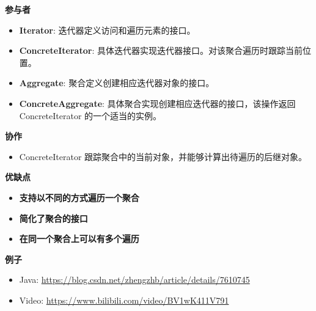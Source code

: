 \noindent\textbf{参与者}
\begin{itemize}
    \item \textbf{Iterator}: 迭代器定义访问和遍历元素的接口。
    \item \textbf{ConcreteIterator}: 具体迭代器实现迭代器接口。对该聚合遍历时跟踪当前位置。
    \item \textbf{Aggregate}: 聚合定义创建相应迭代器对象的接口。
    \item \textbf{ConcreteAggregate}: 具体聚合实现创建相应迭代器的接口，该操作返回 ConcreteIterator 的一个适当的实例。
\end{itemize}

\noindent\textbf{协作}
\begin{itemize}
    \item ConcreteIterator 跟踪聚合中的当前对象，并能够计算出待遍历的后继对象。
\end{itemize}

\noindent\textbf{优缺点}

\begin{itemize}
    \item \textbf{支持以不同的方式遍历一个聚合}
    \item \textbf{简化了聚合的接口}
    \item \textbf{在同一个聚合上可以有多个遍历}
\end{itemize}

\noindent\textbf{例子}

\begin{itemize}
    \item Java: \url{https://blog.csdn.net/zhengzhb/article/details/7610745}
    \item Video: \url{https://www.bilibili.com/video/BV1wK411V791}
\end{itemize}



\newpage